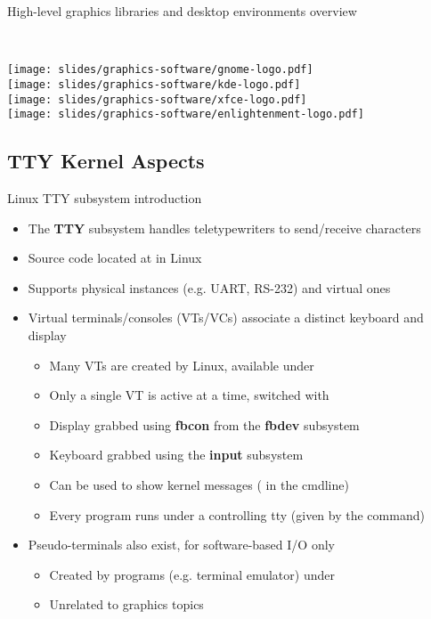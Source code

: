 \begin{frame}{High-level graphics libraries and desktop environments overview}
\begin{minipage}[b]{0.8\textwidth}
  \vfill~
  \end{minipage}
  \begin{minipage}[b]{0.09\textwidth}
  \centering
  \texttt{[image: slides/graphics-software/gnome-logo.pdf]}\\
  \vspace{1em}
  \texttt{[image: slides/graphics-software/kde-logo.pdf]}\\
  \vspace{1em}
  \texttt{[image: slides/graphics-software/xfce-logo.pdf]}\\
  \vspace{0.5em}
  \texttt{[image: slides/graphics-software/enlightenment-logo.pdf]}
  \end{minipage}
\end{frame}

\subsection{TTY Kernel Aspects}

\begin{frame}{Linux TTY subsystem introduction}
  \begin{itemize}
  \item The \textbf{TTY} subsystem handles teletypewriters to send/receive characters
  \item Source code located at  in Linux
  \item Supports physical instances (e.g. UART, RS-232) and virtual ones
  \item Virtual terminals/consoles (VTs/VCs) associate a distinct keyboard and display
    \begin{itemize}
    \item Many VTs are created by Linux, available under 
    \item Only a single VT is active at a time, switched with 
    \item Display grabbed using \textbf{fbcon} from the \textbf{fbdev} subsystem
    \item Keyboard grabbed using the \textbf{input} subsystem
    \item Can be used to show kernel messages ( in the cmdline)
    \item Every program runs under a controlling tty (given by the  command)
    \end{itemize}
  \item Pseudo-terminals also exist, for software-based I/O only
    \begin{itemize}
    \item Created by programs (e.g. terminal emulator) under 
    \item Unrelated to graphics topics
    \end{itemize}
  \end{itemize}
\end{frame}

